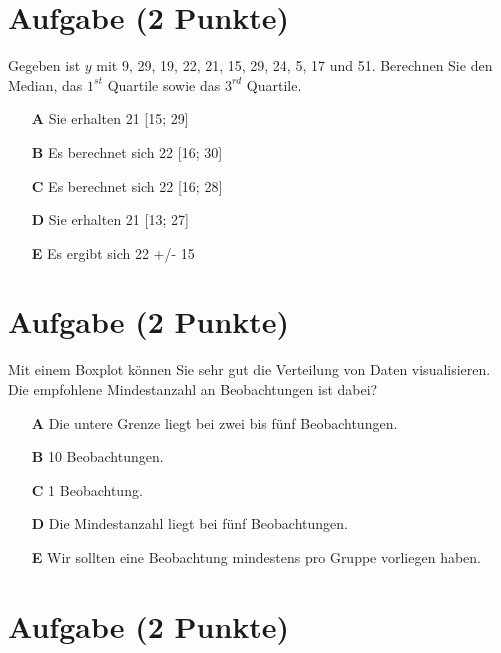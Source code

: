 \documentclass[a4paper, 9pt]{scrartcl}\usepackage[]{graphicx}\usepackage[]{xcolor}
\begin{document}
\section{Aufgabe \hfill (2 Punkte)}




Gegeben ist $y$ mit 9, 29, 19, 22, 21, 15, 29, 24, 5, 17 und 51. Berechnen Sie den Median, das $1^{st}$ Quartile sowie das $3^{rd}$ Quartile.




\begin{enumerate}
\item [\textbf{A} \msquare] Sie erhalten 21 [15; 29]
\item [\textbf{B} \msquare] Es berechnet sich 22 [16; 30]
\item [\textbf{C} \msquare] Es berechnet sich 22 [16; 28]
\item [\textbf{D} \msquare] Sie erhalten 21 [13; 27]
\item [\textbf{E} \msquare] Es ergibt sich 22 +/- 15
\end{enumerate} 

\section{Aufgabe \hfill (2 Punkte)}



Mit einem Boxplot  können Sie sehr gut die Verteilung von Daten visualisieren. Die empfohlene Mindestanzahl an Beobachtungen ist dabei?



\begin{enumerate}
\item [\textbf{A} \msquare] Die untere Grenze liegt bei zwei bis fünf Beobachtungen.
\item [\textbf{B} \msquare] 10 Beobachtungen.
\item [\textbf{C} \msquare] 1 Beobachtung.
\item [\textbf{D} \msquare] Die Mindestanzahl liegt bei fünf Beobachtungen.
\item [\textbf{E} \msquare] Wir sollten eine Beobachtung mindestens pro Gruppe vorliegen haben.
\end{enumerate}

\section{Aufgabe \hfill (2 Punkte)}
\end{document}
